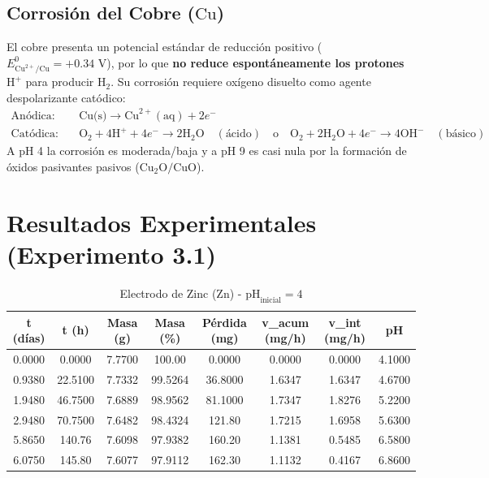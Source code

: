 \documentclass[11pt,a4paper]{article}
\begin{document}
\subsection{Corrosión del Cobre ($\text{Cu}$)}
El cobre presenta un potencial estándar de reducción positivo ($E^0_{\text{Cu}^{2+}/\text{Cu}} = +0.34\text{ V}$), por lo que \textbf{no reduce espontáneamente los protones} $\text{H}^+$ para producir $\text{H}_2$. Su corrosión requiere oxígeno disuelto como agente despolarizante catódico:
\begin{align}
    \text{Anódica:} \quad & \text{Cu(s)} \rightarrow \text{Cu}^{2+}(\text{aq}) + 2e^- \\
    \text{Catódica:} \quad & \text{O}_2 + 4\text{H}^+ + 4e^- \rightarrow 2\text{H}_2\text{O} \quad (\text{ácido}) \quad \text{o} \quad \text{O}_2 + 2\text{H}_2\text{O} + 4e^- \rightarrow 4\text{OH}^- \quad (\text{básico})
\end{align}
A pH 4 la corrosión es moderada/baja y a pH 9 es casi nula por la formación de óxidos pasivantes pasivos ($\text{Cu}_2\text{O} / \text{CuO}$).


\section{Resultados Experimentales (Experimento 3.1)}

\begin{table}[H]
\centering
\caption{Electrodo de Zinc (Zn) - $\text{pH}_{\text{inicial}} = 4$}
\label{tab:zn_ph4}
\begin{tabular}{cccccccc}
\toprule
t (días) & t (h) & Masa (g) & Masa (\%) & Pérdida (mg) & v\_acum (mg/h) & v\_int (mg/h) & pH \\
\midrule
0.0000 & 0.0000 & 7.7700 & 100.00 & 0.0000 & 0.0000 & 0.0000 & 4.1000 \\
0.9380 & 22.5100 & 7.7332 & 99.5264 & 36.8000 & 1.6347 & 1.6347 & 4.6700 \\
1.9480 & 46.7500 & 7.6889 & 98.9562 & 81.1000 & 1.7347 & 1.8276 & 5.2200 \\
2.9480 & 70.7500 & 7.6482 & 98.4324 & 121.80 & 1.7215 & 1.6958 & 5.6300 \\
5.8650 & 140.76 & 7.6098 & 97.9382 & 160.20 & 1.1381 & 0.5485 & 6.5800 \\
6.0750 & 145.80 & 7.6077 & 97.9112 & 162.30 & 1.1132 & 0.4167 & 6.8600 \\
\bottomrule
\end{tabular}
\end{table}
\end{document}
